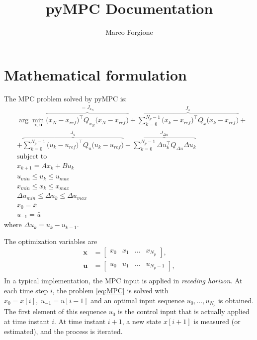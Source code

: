 \documentclass[a4paper,12pt,fleqn]{book}
\newcommand{\varx}{\mathbf{x}}
\newcommand{\varu}{\mathbf{u}}
\newcommand{\QxN}{Q_{x_N}}
\newcommand{\Qx}{Q_{x}}
\newcommand{\Qu}{Q_{u}}
\newcommand{\Qdu}{Q_{\Delta u}}
\newcommand{\Np}{{N_p}}
\begin{document}
 \title{pyMPC Documentation}
\author{Marco Forgione}

\maketitle

\chapter{Mathematical formulation}
The MPC problem solved by pyMPC is:
\begin{subequations}
\label{eq:MPC}
\begin{align}
  &\arg \min_{\varx,\varu} 
  \overbrace{\big(x_N - x_{ref}\big)^\top \QxN \big(x_N - x_{ref}\big)}^{=J_{x_N}} + 
  \overbrace{\sum_{k=0}^{\Np-1} \big(x_k - x_{ref}\big)^\top \Qx\big(x_k - x_{ref}\big)}^{J_{x}}+ \nonumber \\
  &  + 
    \overbrace{\sum_{k=0}^{\Np-1} \big(u_k - u_{ref}\big)^\top \Qu \big(u_k - u_{ref}\big)}^{J_u}
    +  
  \overbrace{\sum_{k=0}^{\Np-1} \Delta u_k^\top \Qdu \Delta u_k}^{J_{\Delta u}} \\ \nonumber
  &\text{subject to} \nonumber\\
  &x_{k+1} = Ax_k + B u_k \label{eq:linear_dynamics} \\ 
  &u_{min} \leq u_k \leq u_{max}\\
  &x_{min} \leq x_k \leq x_{max}\\
  &\Delta u_{min} \leq \Delta u_k \leq \Delta u_{max}\\
  &x_0 = \bar x\\
  &u_{-1} = \bar u
\end{align}
\end{subequations} where $\Delta u_k = u_k - u_{k-1}$.

The optimization variables are 
\begin{align}
  \varx & = \begin{bmatrix}x_0 & x_1 & \dots & x_\Np\end{bmatrix},\\
  \varu & = \begin{bmatrix}u_0 & u_1 & \dots & u_{\Np-1}\end{bmatrix},\\  
\end{align}
In a typical implementation, the MPC input is applied in \emph{receding horizon}. At each time step $i$, the problem \eqref{eq:MPC} is solved with $x_0=x[i],\;u_{-1}=u[{i-1}]$ and an optimal input sequence $u_{0},\dots,u_{\Np}$ is obtained. The first element of this sequence $u_0$ is the control input that is actually applied at time instant $i$. At time instant $i+1$, a new state $x[i+1]$ is measured (or estimated), and the process is iterated. 
\end{document}
